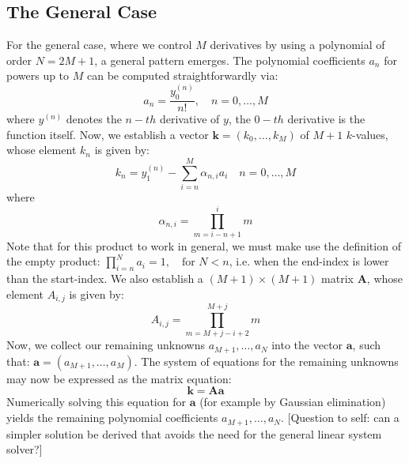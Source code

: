 \subsection{The General Case}
For the general case, where we control $M$ derivatives by using a polynomial of order $N = 2M+1$, a general pattern emerges. The polynomial coefficients $a_n$ for powers up to $M$ can be computed straightforwardly via:
\begin{equation}
 a_n = \frac{y_0^{(n)}}{n!}, \quad n = 0, \ldots, M
\end{equation}
where $y^{(n)}$ denotes the $n-th$ derivative of $y$, the $0-th$ derivative is the function itself. Now, we establish a vector $\mathbf{k} = (k_0, \ldots, k_M)$ of $M+1$ $k$-values, whose element $k_n$ is given by:
\begin{equation}
 k_n = y_1^{(n)} - \sum_{i=n}^M  \alpha_{n,i} a_i \quad n = 0, \ldots, M
\end{equation}
where
\begin{equation}
 \alpha_{n,i} = \prod_{m=i-n+1}^i m
\end{equation}
Note that for this product to work in general, we must make use the definition of the empty product: $\prod_{i=n}^N a_i = 1, \quad \text{for } N < n$, i.e. when the end-index is lower than the start-index. We also establish a $(M+1)\times(M+1)$ matrix $\mathbf{A}$, whose element $A_{i,j}$ is given by:
\begin{equation}
 A_{i,j} = \prod_{m=M+j-i+2}^{M+j} m
\end{equation}
Now, we collect our remaining unknowns $a_{M+1}, \ldots, a_N$ into the vector $\mathbf{a}$, such that: $\mathbf{a} = (a_{M+1}, \ldots, a_M)$. The system of equations for the remaining unknowns may now be expressed as the matrix equation:
\begin{equation}
 \mathbf{k} = \mathbf{A} \mathbf{a}
\end{equation}
Numerically solving this equation for $\mathbf{a}$ (for example by Gaussian elimination) yields the remaining polynomial coefficients $a_{M+1}, \ldots, a_N$. [Question to self: can a simpler solution be derived that avoids the need for the general linear system solver?]







